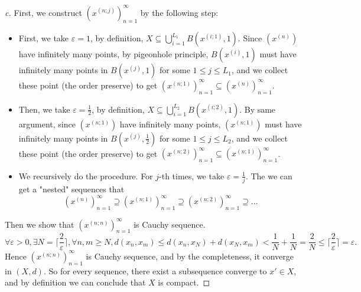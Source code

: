 \begin{proof}[c]
    First, we construct $(x^{(n;j)})_{n=1}^\infty$ by the following step:
    \begin{itemize}
        \item First, we take $\varepsilon = 1$, by definition, $X \subseteq \bigcup_{i=1}^{L_1} B(x^{(i;1)}, 1)$. Since $(x^{(n)})$ have infinitely many points, by pigeonhole principle, $B(x^{(i)}, 1)$ must have infinitely many points in $B(x^{(j)}, 1)$ for some $1 \leq j \leq L_1$, and we collect these point (the order preserve) to get $(x^{(n;1)})_{n=1}^\infty \subseteq (x^{(n)})_{n=1}^\infty$.
        \item Then, we take $\varepsilon = \frac{1}{2}$, by definition, $X \subseteq \bigcup_{i=1}^{L_2} B(x^{(i;2)}, 1)$. By same argument, since $(x^{(n;1)})$ have infinitely many points, $(x^{(n;1)})$ must have infinitely many points in $B(x^{(j)}, \frac{1}{2})$ for some $1 \leq j \leq L_2$, and we collect these point (the order preserve) to get $(x^{(n;2)})_{n=1}^\infty \subseteq (x^{(n;1)})_{n=1}^\infty$.
        \item We recursively do the procedure. For $j$-th times, we take $\varepsilon = \frac{1}{j}$. The we can get a "nested" sequences that 
        \[
        (x^{(n)})_{n=1}^\infty  \supseteq(x^{(n;1)})_{n=1}^\infty \supseteq(x^{(n;2)})_{n=1}^\infty \supseteq ...
        \]
    \end{itemize}
    Then we show that $(x^{(n;n)})_{n=1}^\infty$ is Cauchy sequence. \\
    \[
    \forall \varepsilon > 0, \exists N = \lceil\frac{2}{\varepsilon}\rceil, \forall n, m \geq N, d(x_n, x_m) \leq d(x_n, x_N) + d(x_N, x_m) < \frac{1}{N} + \frac{1}{N} = \frac{2}{N} \leq \lceil\frac{2}{\varepsilon}\rceil = \varepsilon.
    \]
    Hence $(x^{(n;n)})_{n=1}^\infty$ is Cauchy sequence, and by the completeness, it converge in $(X, d)$. So for every sequence, there exist a subsequence converge to $x' \in X$, and by definition we can conclude that $X$ is compact.
\end{proof}

